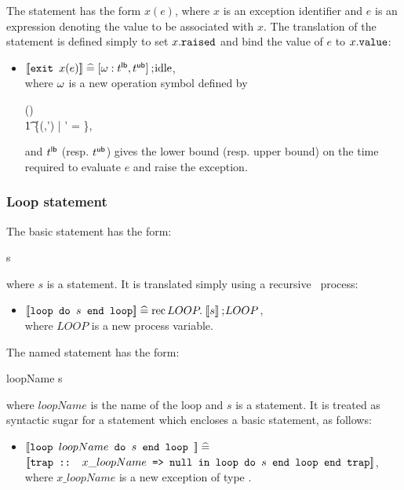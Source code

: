 The  statement has the form  $x(e)$, where 
$x$ is an exception identifier and $e$ is an expression denoting
the value to be associated with $x$. The translation of 
the  statement is defined simply to set $x.\mbox{\tt raised}$ and bind
the value of $e$ to $x.\mbox{\tt value}$: 
\begin{itemize}
\item ${\lbrack\!\lbrack} \mbox{\tt exit } x(e) {\rbrack\!\rbrack} \mathrel{\widehat=} [\omega : t^{{\sf lb}}, t^{{\sf ub}}] \mathbin{\mathrm{;}\!} \mathrm{idle}$, \\
  where $\omega$ is a new operation symbol defined by
  \begin{zed}
     \interpop(\op)  \\
  \t1 \{(\val,\val') \in \valuation \cross \valuation |
        \val' = \},
  \end{zed}
  and $t^{{\sf lb}}$ (resp. $t^{{\sf ub}}$) gives the lower bound (resp. upper
  bound) on the time required to evaluate $e$ and raise the exception.
\end{itemize}

\subsubsection{Loop statement}
The basic  statement has the form:
\begin{zed}
 s 
\end{zed}
where $s$ is a statement.
It is translated simply using a recursive \bcandle\ process:
\begin{itemize}
\item $\sbl \trm{loop do } s \trm{ end loop}\sbr \defs 
  \rec LOOP  . \;\sbl s \sbr \sq LOOP$, \\
  where $LOOP$ is a new process variable. 
\end{itemize}

\par\noindent
The named  statement has the form:
\begin{zed}
 loopName  s 
\end{zed}
where $loopName$ is the name of the loop and $s$ is a
statement.
It is treated as syntactic sugar for a  statement which encloses
a basic  statement, as follows:
\begin{itemize}
\item $\sbl \trm{loop } loopName \trm{ do } s \trm{ end loop } \sbr 
  \defs$
  \\ \hspace*{1em} $\sbl \trm{trap :: } x\_loopName \trm{ => null in 
                         loop do } s \trm{ end loop end trap} \sbr$, \\
  where $x\_loopName$ is a new exception of type .
\end{itemize} 

